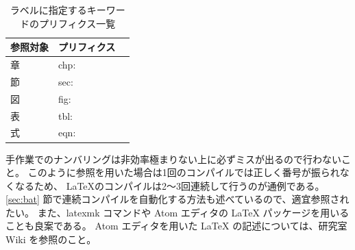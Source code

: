 \begin{table}[H]
  \caption{ラベルに指定するキーワードのプリフィクス一覧}
  \label{tbl:pre_list}
  \centering
  \begin{tabular}{|l|l|r|} \hline
   参照対象	& プリフィクス \\ \hline
   章		& chp: \\ \hline
   節		& sec: \\ \hline
   図		& fig: \\ \hline
   表 		& tbl: \\ \hline
   式   	& eqn: \\ \hline
  \end{tabular}
\end{table}

手作業でのナンバリングは非効率極まりない上に必ずミスが出るので行わないこと。
このように参照を用いた場合は1回のコンパイルでは正しく番号が振られなくなるため、
\LaTeX のコンパイルは2～3回連続して行うのが通例である。
\ref{sec:bat} 節で連続コンパイルを自動化する方法も述べているので、適宜参照されたい。
また、latexmk コマンドや Atom エディタの LaTeX パッケージを用いることも良案である。
Atom エディタを用いた LaTeX の記述については、研究室 Wiki を参照のこと。
